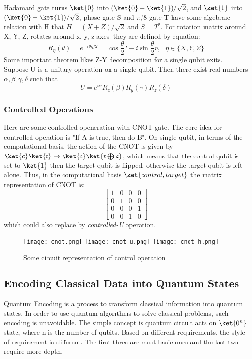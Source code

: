 Hadamard gate turns $\ket{0}$ into $(\ket{0}+\ket{1})/\sqrt{2}$, and 
$\ket{1}$ into $(\ket{0}-\ket{1})/\sqrt{2}$, phase gate S and $\pi/8$ gate T 
have some algebraic relation with H that $H = (X+Z)/\sqrt{2}$ and 
$S = T^2$. For rotation matrix around X, Y, Z, rotates around x, y, z axes, 
they are defined by equation:
$$R_{\eta}(\theta) = e^{-i \theta \eta /2} = \cos \frac{\theta}{2}I -i \sin \frac{\theta}{2} \eta, \ \ \ \eta \in \{X,Y,Z\}$$
Some important theorem likes Z-Y decomposition for a single qubit 
exits. Suppose U is a unitary operation on a single qubit. Then there exist
real numbers $\alpha, \beta, \gamma, \delta$ such that 
\begin{equation}
  U = e^{i \alpha} R_z(\beta) R_y (\gamma) R_z(\delta)
\end{equation}

\subsubsection*{Controlled Operations}
Here are some controlled openeration with CNOT gate. The core 
idea for controlled operation is "If A is true, then do B". On 
single qubit, in terms of the computational basis, the action
of the CNOT is given by $\ket{c} \ket{t} \rightarrow \ket{c} \ket{t \bigoplus c }$,
which means that the control qubit is set to $\ket{1}$ then the target
qubit is flipped, otherwise the target qubit is left alone. Thus, 
in the computational basis $\ket{control, target}$ the matrix representation
of CNOT is: 
\begin{equation}
  \begin{bmatrix}
    1 & 0 & 0 & 0 \\
    0 & 1 & 0 & 0 \\
    0 & 0 & 0 & 1 \\
    0 & 0 & 1 & 0 
  \end{bmatrix}
\end{equation}
which could also replace by \textit{controlled-U} operation. 
\begin{figure}[h]
  \texttt{[image: cnot.png]}
  \texttt{[image: cnot-u.png]}
  \texttt{[image: cnot-h.png]}
  \caption{Some circuit representation of control operation}
\end{figure}
\subsection*{Encoding Classical Data into Quantum States}
Quantum Encoding is a process to transform classical information into quantum 
states. In order to use quantum algorithms to solve classical problems, 
such encoding is unavoidable. The simple concept is quantum circuit acts on 
$\ket{0^n}$ state, where n is the number of qubits. Based on different 
requirements, the style of requirement is different. The first three are 
most basic ones and the last two require more depth. 

